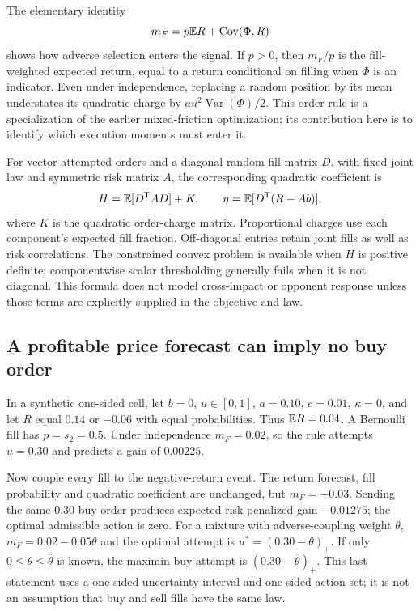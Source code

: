 The elementary identity
\begin{equation}\label{eq:fillforecastbias}
 m_F=p\mathbb E R+\operatorname{Cov}(\Phi,R)
\end{equation}
shows how adverse selection enters the signal. If \(p>0\), then
\(m_F/p\) is the fill-weighted expected return, equal to a return
conditional on filling when \(\Phi\) is an indicator. Even under
independence, replacing a random position by its mean understates its
quadratic charge by
\(a u^2\operatorname{Var}(\Phi)/2\). This order rule is a specialization
of the earlier mixed-friction optimization; its contribution here is to
identify which execution moments must enter it.

For vector attempted orders and a diagonal random fill matrix \(D\),
with fixed joint law and symmetric risk matrix \(A\), the corresponding
quadratic coefficient is
\[
 H=\mathbb E[D^{\mathsf T}AD]+K,
 \qquad \eta=\mathbb E[D^{\mathsf T}(R-Ab)],
\]
where \(K\) is the quadratic order-charge matrix. Proportional charges
use each component's expected fill fraction. Off-diagonal entries retain
joint fills as well as risk correlations. The constrained convex problem
is available when \(H\) is positive definite; componentwise scalar
thresholding generally fails when it is not diagonal. This formula does
not model cross-impact or opponent response unless those terms are
explicitly supplied in the objective and law.

\subsection{A profitable price forecast can imply no buy order}\label{sec:couplingexample}

In a synthetic one-sided cell, let \(b=0\), \(u\in[0,1]\), \(a=0.10\),
\(c=0.01\), \(\kappa=0\), and let \(R\) equal \(0.14\) or \(-0.06\)
with equal probabilities. Thus \(\mathbb E R=0.04\). A Bernoulli fill has
\(p=s_2=0.5\). Under independence \(m_F=0.02\), so the rule attempts
\(u=0.30\) and predicts a gain of \(0.00225\).

Now couple every fill to the negative-return event. The return forecast,
fill probability and quadratic coefficient are unchanged, but
\(m_F=-0.03\). Sending the same \(0.30\) buy order produces expected
risk-penalized gain \(-0.01275\); the optimal admissible action is zero.
For a mixture with adverse-coupling weight \(\theta\),
\(m_F=0.02-0.05\theta\) and the optimal attempt is
\(u^*=(0.30-\theta)_+\). If only
\(0\le\theta\le\overline\theta\) is known, the maximin buy attempt is
\((0.30-\overline\theta)_+\). This last statement uses a one-sided
uncertainty interval and one-sided action set; it is not an assumption
that buy and sell fills have the same law.

